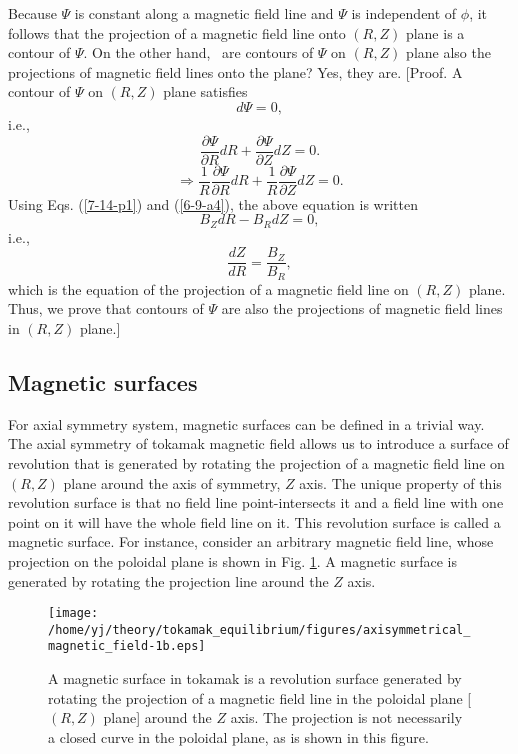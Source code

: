 \documentclass{llncs}
\begin{document}
Because $\Psi$ is constant along a magnetic field line and $\Psi$ is
independent of $\phi$, it follows that the projection of a magnetic field line
onto $(R, Z)$ plane is a contour of $\Psi$. On the other hand, \ are contours
of $\Psi$ on $(R, Z)$ plane also the projections of magnetic field lines onto
the plane? Yes, they are. [Proof. A contour of $\Psi$ on $(R, Z)$ plane
satisfies
\begin{equation}
  d \Psi = 0,
\end{equation}
i.e.,
\begin{equation}
  \frac{\partial \Psi}{\partial R} d R + \frac{\partial \Psi}{\partial Z} d Z
  = 0.
\end{equation}
\begin{equation}
  \Rightarrow \frac{1}{R}  \frac{\partial \Psi}{\partial R} d R + \frac{1}{R} 
  \frac{\partial \Psi}{\partial Z} d Z = 0.
\end{equation}
Using Eqs. (\ref{7-14-p1}) and (\ref{6-9-a4}), the above equation is written
\begin{equation}
  B_Z d R - B_R d Z = 0,
\end{equation}
i.e.,
\begin{equation}
  \label{8-22-1} \frac{d Z}{d R} = \frac{B_Z}{B_R},
\end{equation}
which is the equation of the projection of a magnetic field line on $(R, Z)$
plane. Thus, we prove that contours of $\Psi$ are also the projections of
magnetic field lines in $(R, Z)$ plane.]

\subsection{Magnetic surfaces}

For axial symmetry system, magnetic surfaces can be defined in a trivial way.
The axial symmetry of tokamak magnetic field allows us to introduce a surface
of revolution that is generated by rotating the projection of a magnetic field
line on $(R, Z)$ plane around the axis of symmetry, $Z$ axis. The unique
property of this revolution surface is that no field line point-intersects it
and a field line with one point on it will have the whole field line on it.
This revolution surface is called a magnetic surface. For instance, consider
an arbitrary magnetic field line, whose projection on the poloidal plane is
shown in Fig. \ref{7-28-5}. A magnetic surface is generated by rotating the
projection line around the $Z$ axis.

\begin{figure}[h]
  \texttt{[image: /home/yj/theory/tokamak\_equilibrium/figures/axisymmetrical\_magnetic\_field-1b.eps]}
  \caption{\label{7-28-5}A magnetic surface in tokamak is a revolution surface
  generated by rotating the projection of a magnetic field line in the
  poloidal plane [$(R, Z)$ plane] around the $Z$ axis. The projection is not
  necessarily a closed curve in the poloidal plane, as is shown in this
  figure.}
\end{figure}
\end{document}
